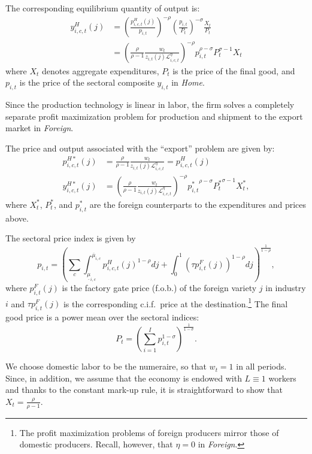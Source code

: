 \documentclass[onehalfspacing,11pt]{article}
\begin{document}
The corresponding equilibrium quantity of output is: 
\begin{align}
y_{i,c,t}^H(j) & =\left( \frac{p_{i,c,t}^H(j)}{p_{i,t}}\right) ^{-\rho} \left( \frac{p_{i,t}}{P_t} \right)^{-\sigma} \frac{X_{t}}{P_{t}} \nonumber \\
& =\left( \frac{\rho }{\rho -1}\frac{w_{t}}{z_{i,t}(j) \mathcal{L}_{i,c,t}^\eta}\right) ^{-\rho } p_{i,t}^{\rho-\sigma} P_t^{\sigma-1} X_t
\label{eq:monopolist_output}
\end{align}%
where $X_{t}$ denotes aggregate expenditures, $P_{t}$ is the price of the final good, and $p_{i,t}$ is the price of the sectoral composite $y_{i,t}$ in {\it Home}.

Since the production technology is linear in labor, the firm solves a completely separate profit maximization problem for production and shipment to the export market in {\it Foreign}.

The price and output associated with the ``export'' problem are given by:
\begin{align}
\label{}
p_{i,c,t}^{H*}(j) & =\frac{\rho }{\rho -1}\frac{w_{t}}{z_{i,t}(j) \mathcal{L}_{i,c,t}^\eta} = p_{i,c,t}^{H}(j)  \\
y_{i,c,t}^{H*}(j) &  =\left( \frac{\rho }{\rho -1}\frac{w_{t}}{z_{i,t}(j) \mathcal{L}_{i,c,t}^\eta} \right) ^{-\rho } {p_{i,t}^*}^{\rho-\sigma} {P_t^*}^{\sigma-1} X_t^*,
\end{align}
where $X_{t}^*$, $P_{t}^*$, and $p_{i,t}^*$ are the foreign counterparts to the expenditures and prices above.

The sectoral price index is given by
\begin{equation}
\label{ }
p_{i,t} = \left( \sum_c \int_{\underline{\mu}_{i,c}}^{\overline{\mu}_{i,c}} p_{i,c,t}^H(j)^{1-\rho} dj + \int_0^1 \left( \tau p_{i,t}^F(j) \right)^{1-\rho} dj \right)^{\frac{1}{1-\rho}},
\end{equation}
where $p_{i,t}^F(j)$ is the factory gate price (f.o.b.) of the foreign variety $j$ in industry $i$ and $\tau p_{i,t}^F(j)$ is the corresponding c.i.f.~price at the destination.\footnote{The profit maximization problems of foreign producers mirror those of domestic producers. Recall, however, that $\eta=0$ in {\it Foreign}.}
The final good price is a power mean over the sectoral indices:
\begin{equation}
\label{ }
P_t = \left( \sum_{i=1}^I p_{i,t}^{1-\sigma} \right)^{\frac{1}{1-\sigma}}.
\end{equation}

We choose domestic labor to be the numeraire, so that $w_t=1$ in all periods. Since, in addition, we assume that the economy is endowed with $L \equiv 1$ workers and thanks to the constant mark-up rule, it is straightforward to show that $X_t = \frac{\rho}{\rho-1}$.
\end{document}
